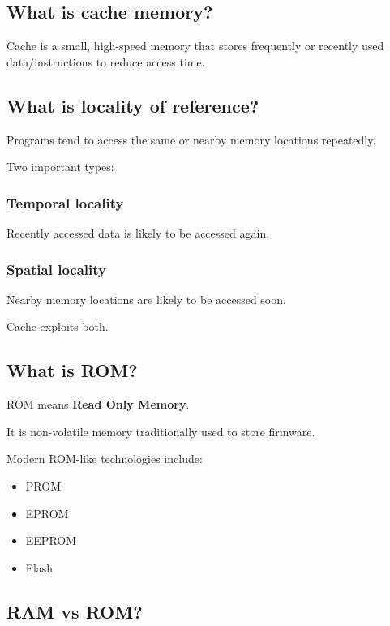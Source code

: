 \medskip

\subsection{What is cache memory?}

Cache is a small, high-speed memory that stores frequently or recently used data/instructions to reduce access time.

\medskip

\subsection{What is locality of reference?}

Programs tend to access the same or nearby memory locations repeatedly.

Two important types:

\subsubsection{Temporal locality}

Recently accessed data is likely to be accessed again.

\subsubsection{Spatial locality}

Nearby memory locations are likely to be accessed soon.

Cache exploits both.

\medskip

\subsection{What is ROM?}

ROM means \textbf{Read Only Memory}.

It is non-volatile memory traditionally used to store firmware.

Modern ROM-like technologies include:

\begin{itemize}
  \item PROM
  \item EPROM
  \item EEPROM
  \item Flash
\end{itemize}

\medskip

\subsection{RAM vs ROM?}

